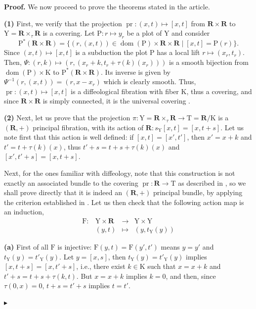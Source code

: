 \documentclass[10pt,letterpaper,reqno]{amsart}
\theoremstyle{article}
\renewenvironment{proof}{\noindent \textbf{Proof.}} {\nolinebreak $\blacktriangleright$}
\newcommand{\1}{{\hat 1}}
\newcommand{\0}{{\hat 0}}
\newcommand{\RR}{\mathbf R}
\def \F{\mathrm F}
\def \K{\mathrm K}
\def \P{\mathrm P}
\def \T{\mathrm T}
\def \Y{\mathrm Y}
\newcommand{\cl}[1]{\left[ #1 \right]}
\newcommand{\Ka}{\K}
\newcommand{\pr}{\operatorname{pr}}
\begin{document}
  \begin{proof}
    We now proceed to prove the theorems stated in the article.
    
    \textbf{(1)} First,
    we verify that the projection $\pr : (x,t) \mapsto \cl{x,t}$ from $\RR \times \RR$ to $\Y = \RR \times_\tau \RR$ is a covering.
    Let $\P : r \mapsto y_r$ be a plot of $\Y$ and consider
    $$
      \P^*(\RR \times \RR) = \{(r,(x,t)) \in \operatorname{dom}(\P) \times \RR \times \RR \mid \cl{x,t} = \P(r) \}.
      $$
    Since $(x,t) \mapsto \cl{x,t}$ is a subduction the plot $\P$ has a local lift $r \mapsto (x_r,t_r)$.
    Then,
    $\Psi : (r,k) \mapsto (r,(x_r + k, t_r + \tau(k)(x_r)))$ is a smooth bijection from $\operatorname{dom}(\P) \times \Ka$ to $\P^*(\RR \times \RR)$.
    Its inverse is given by $\Psi^{-1}(r,(x,t)) = (r,x-x_r)$ which is clearly smooth.
    Thus,
    $\pr : (x,t) \mapsto \cl{x,t}$ is a diffeological fibration with fiber $\Ka$,
    thus a covering,
    and since $\RR \times \RR$ is simply connected,
    it is the universal covering \cite[]{PIZ13}.
    
    \textbf{(2)} Next,
    let us prove that the projection $\pi : \Y = \RR \times_\tau \RR \to \T = \RR/\Ka$ is a $(\RR,+)$ principal fibration,
    with its action of $\RR : s_\Y\cl{x,t} = \cl{x, t + s}$.
    Let us note first that this action is well defined:
    if $\cl{x,t} = \cl{x',t'}$,
    then $x' = x + k$ and $t' = t + \tau(k)(x)$,
    thus $t' + s = t+ s + \tau(k)(x)$ and $\cl{x',t' + s} = \cl{x, t + s}$.
    
    Next,
    for the ones familiar with diffeology,
    note that this construction is not exactly an associated bundle to the covering $\pr : \RR \to \T$ as described in \cite[]{PIZ13},
    so we shall prove directly that it is indeed an $(\RR,+)$ principal bundle,
    by applying the criterion established in \cite[]{PIZ13}.
    Let us then check that the following action map is an induction,
    \begin{equation*}
      \begin{array}{rccl}
        \F : & \Y \times \RR & \to      &  \Y \times \Y \\
        &  (y,t)         & \mapsto &  (y,t_\Y(y))
      \end{array}
    \end{equation*}
    
    \textbf{(a)} First of all $\F$ is injective:
    $\F(y,t) = \F(y',t')$ means $y = y'$ and $t_\Y(y) = t'_\Y(y)$.
    Let $y = \cl{x,s}$,
    then $t_\Y(y) =  t'_\Y(y)$ implies $\cl{x, t+s} = \cl{x, t'+s}$,
    i.e.,
    there exist $k \in \Ka$ such that $x = x+k$ and $t'+s = t + s + \tau(k,t)$.
    But  $x = x+k$ implies $k=0$,
    and then,
    since $\tau(0,x) = 0$,
    $t+s = t' + s$ implies $t=t'$.
    

\end{proof}
\end{document}
